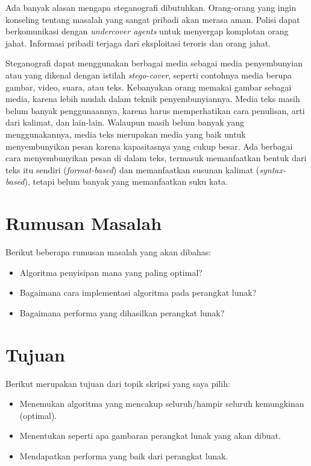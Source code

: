 Ada banyak alasan mengapa steganografi dibutuhkan. \cite{Dpcrypto:2009}Orang-orang yang ingin konseling tentang masalah yang sangat pribadi akan merasa aman. Polisi dapat berkomunikasi dengan \textit{undercover agents} untuk menyergap komplotan orang jahat. Informasi pribadi terjaga dari eksploitasi teroris dan orang jahat.

Steganografi dapat menggunakan berbagai media sebagai media penyembunyian atau yang dikenal dengan istilah \textit{stego-cover}, seperti contohnya media berupa gambar, video, suara, atau teks. Kebanyakan orang memakai gambar sebagai media, karena lebih mudah dalam teknik penyembunyiannya. Media teks masih belum banyak penggunaannya, karena harus memperhatikan cara penulisan, arti dari kalimat, dan lain-lain. Walaupun masih belum banyak yang menggunakannya, media teks merupakan media yang baik untuk menyembunyikan pesan karena kapasitasnya yang cukup besar. Ada berbagai cara menyembunyikan pesan di dalam teks, termasuk memanfaatkan bentuk dari teks itu sendiri (\textit{format-based}) dan memanfaatkan susunan kalimat (\textit{syntax-based}), tetapi belum banyak yang memanfaatkan suku kata.

\section{Rumusan Masalah}
\label{rumusanMasalah}
Berikut beberapa rumusan masalah yang akan dibahas:
\begin{itemize}
	\item Algoritma penyisipan mana yang paling optimal?
	\item Bagaimana cara implementasi algoritma pada perangkat lunak?
	\item Bagaimana performa yang dihasilkan perangkat lunak?
\end{itemize}

\section{Tujuan}
\label{sec:tujuan}
Berikut merupakan tujuan dari topik skripsi yang saya pilih:
\begin{itemize}
	\item Menemukan algoritma yang mencakup seluruh/hampir seluruh kemungkinan (optimal).
	\item Menentukan seperti apa gambaran perangkat lunak yang akan dibuat.
	\item Mendapatkan performa yang baik dari perangkat lunak.
\end{itemize}

